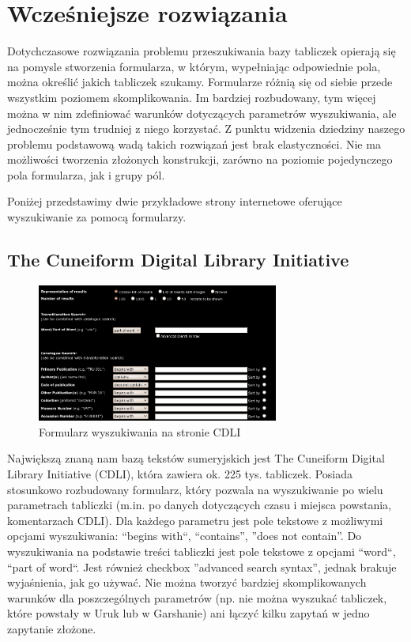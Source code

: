 \section{Wcześniejsze rozwiązania}\label{r:losers}
Dotychczasowe rozwiązania problemu przeszukiwania bazy tabliczek opierają się na pomysle stworzenia formularza,
w którym, wypełniając odpowiednie pola, można określić jakich tabliczek szukamy.
Formularze różnią się od siebie przede wszystkim poziomem skomplikowania.
Im bardziej rozbudowany, tym więcej można w nim zdefiniować warunków dotyczących parametrów wyszukiwania,
ale jednocześnie tym trudniej z niego korzystać.
Z punktu widzenia dziedziny naszego problemu podstawową wadą takich rozwiązań jest 
brak elastyczności. Nie ma możliwości tworzenia złożonych konstrukcji, 
zarówno na poziomie pojedynczego pola formularza, jak i grupy pól.

Poniżej przedstawimy dwie przykładowe strony internetowe oferujące wyszukiwanie za pomocą formularzy.

\subsection{\label{chapter:cdli}The Cuneiform Digital Library Initiative \cite{cdli}}
\begin{figure}[h]
 \centering
 \includegraphics[width=300px]{../diagramy/cdli-search.png}
 \caption{Formularz wyszukiwania na stronie CDLI}
 \label{fig:cdli-search}
\end{figure}
Największą znaną nam bazą tekstów sumeryjskich jest The Cuneiform Digital Library Initiative (CDLI),
która zawiera ok. 225 tys. tabliczek.
Posiada stosunkowo rozbudowany formularz, 
który pozwala na wyszukiwanie po wielu parametrach tabliczki 
(m.in. po danych dotyczących czasu i miejsca powstania, komentarzach CDLI). 
Dla każdego parametru jest pole tekstowe z możliwymi opcjami wyszukiwania:
``begins with``, ``contains'', ''does not contain''.
Do wyszukiwania na podstawie treści tabliczki jest pole tekstowe z opcjami ``word``, ``part of word``.
Jest również checkbox ''advanced search syntax'', jednak brakuje wyjaśnienia, jak go używać.
Nie można tworzyć bardziej skomplikowanych warunków dla poszczególnych parametrów
(np. nie można wyszukać tabliczek, które powstały w Uruk lub w Garshanie)
ani łączyć kilku zapytań w jedno zapytanie złożone.

